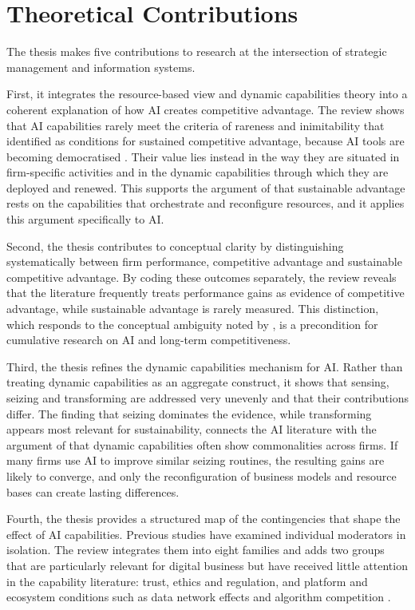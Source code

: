 \section{Theoretical Contributions}
\label{sec:contributions}

The thesis makes five contributions to research at the intersection of strategic management and information systems.

First, it integrates the resource-based view and dynamic capabilities theory into a coherent explanation of how AI creates competitive advantage. The review shows that AI capabilities rarely meet the criteria of rareness and inimitability that \textcite[99]{barney1991} identified as conditions for sustained competitive advantage, because AI tools are becoming democratised . Their value lies instead in the way they are situated in firm-specific activities  and in the dynamic capabilities through which they are deployed and renewed. This supports the argument of \textcite[1319]{teece2007} that sustainable advantage rests on the capabilities that orchestrate and reconfigure resources, and it applies this argument specifically to AI.

Second, the thesis contributes to conceptual clarity by distinguishing systematically between firm performance, competitive advantage and sustainable competitive advantage. By coding these outcomes separately, the review reveals that the literature frequently treats performance gains as evidence of competitive advantage, while sustainable advantage is rarely measured. This distinction, which responds to the conceptual ambiguity noted by \textcite[1]{wu2026}, is a precondition for cumulative research on AI and long-term competitiveness.

Third, the thesis refines the dynamic capabilities mechanism for AI. Rather than treating dynamic capabilities as an aggregate construct, it shows that sensing, seizing and transforming are addressed very unevenly and that their contributions differ. The finding that seizing dominates the evidence, while transforming appears most relevant for sustainability, connects the AI literature with the argument of \textcite[1105]{eisenhardt2000} that dynamic capabilities often show commonalities across firms. If many firms use AI to improve similar seizing routines, the resulting gains are likely to converge, and only the reconfiguration of business models and resource bases can create lasting differences.

Fourth, the thesis provides a structured map of the contingencies that shape the effect of AI capabilities. Previous studies have examined individual moderators in isolation. The review integrates them into eight families and adds two groups that are particularly relevant for digital business but have received little attention in the capability literature: trust, ethics and regulation, and platform and ecosystem conditions such as data network effects and algorithm competition .

